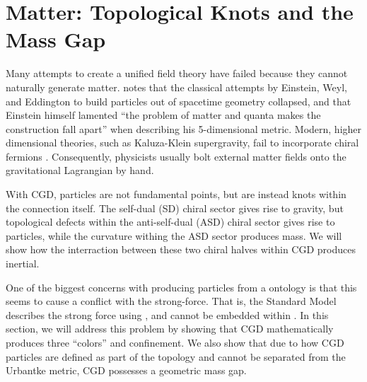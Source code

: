 
\section{Matter: Topological Knots and the Mass Gap}
\label{sec:Matter}

Many attempts to create a unified field theory have failed because they cannot naturally generate matter. \citet{goenner2004history} notes that the classical attempts by Einstein, Weyl, and Eddington to build particles out of spacetime geometry collapsed, and that Einstein himself lamented ``the problem of matter and quanta makes the construction fall apart'' when describing his 5-dimensional metric. Modern, higher dimensional theories, such as Kaluza-Klein supergravity, fail to incorporate chiral fermions \citep{witten1981search}. Consequently, physicists usually bolt external matter fields onto the gravitational Lagrangian by hand.

With CGD, particles are not fundamental points, but are instead knots within the connection itself. The self-dual (SD) chiral \slTwoC sector gives rise to gravity, but topological defects within the anti-self-dual (ASD) chiral \slTwoC sector gives rise to particles, while the curvature withing the ASD sector produces mass. We will show how the interraction between these two chiral halves within CGD produces inertial.

One of the biggest concerns with producing particles from a \spinFourC ontology is that this seems to cause a conflict with the strong-force. That is, the Standard Model describes the strong force using \suThree, and \suThree cannot be embedded within \spinFourC. In this section, we will address this problem by showing that CGD mathematically produces three ``colors'' and confinement. We also show that due to how CGD particles are defined as part of the topology and cannot be separated from the Urbantke metric, CGD possesses a geometric mass gap.


